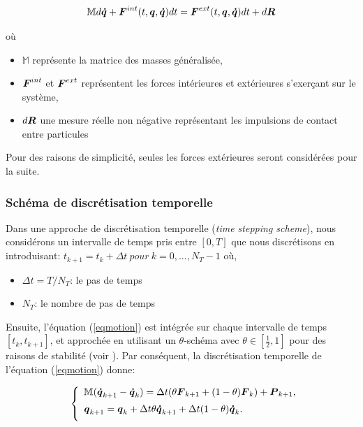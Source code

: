 \begin{equation}
\mathbb{M} d\boldsymbol{\dot{q}} + \mbox{\boldmath{$F$}}^{int}(t,\boldsymbol{q},\boldsymbol{\dot{q}})dt = \mbox{\boldmath{$F$}}^{ext}(t,\boldsymbol{q},\boldsymbol{\dot{q}})dt + d\mbox{\boldmath{$R$}}
\label{eqmotion}
\end{equation}

\noindent où
\begin{itemize}
    \item $\mathbb{M}$ représente la matrice des masses généralisée,
    \item $\mbox{\boldmath{$F$}}^{int}$ et $\mbox{\boldmath{$F$}}^{ext}$ représentent les forces intérieures et extérieures s'exerçant sur le système,
    \item $d\mbox{\boldmath{$R$}}$ une mesure réelle non négative représentant les impulsions de contact entre particules 
\end{itemize}

Pour des raisons de simplicité, seules les forces extérieures seront considérées pour la suite.

\subsubsection{Schéma de discrétisation temporelle}

Dans une approche de discrétisation temporelle (\textit{time stepping scheme}), nous considérons un intervalle de temps pris entre $[0,T]$ que nous discrétisons en introduisant:
$t_{k+1} = t_k + \Delta{t}\ pour\ k = 0,...,N_T - 1$ où,

\begin{itemize}
    \item $\Delta{t} = T / N_T$: le pas de temps
    \item $N_T$: le nombre de pas de temps
\end{itemize}

Ensuite, l'équation (\ref{eqmotion}) est intégrée sur chaque intervalle de temps $[t_k,t_{k+1}]$, et approchée en utilisant un $\theta$-schéma avec $\theta \in [\frac{1}{2},1]$ pour des raisons de stabilité (voir \cite{moreau1999sweeping, renouf2005conjugate}). Par conséquent, la discrétisation temporelle de l'équation (\ref{eqmotion}) donne:


\begin{eqnarray}
&& \left\{\begin{array}{lll}
\mathbb{M} (\boldsymbol{\dot{q}}_{k+1} - \boldsymbol{\dot{q}}_{k}) =  
\Delta{t}(\theta \mbox{\boldmath{$F$}}_{k+1} + (1 - \theta)\mbox{\boldmath{$F$}}_k) + \mbox{\boldmath{$P$}}_{k+1},\\[2mm]
\boldsymbol{q}_{k+1} = \boldsymbol{q}_{k} + \Delta{t} \theta \boldsymbol{\dot{q}}_{k+1} + \Delta{t} (1 - \theta) \boldsymbol{\dot{q}}_{k}.\\[2mm]
\end{array}\right.
\label{eqmotiondiscr}
\end{eqnarray}

